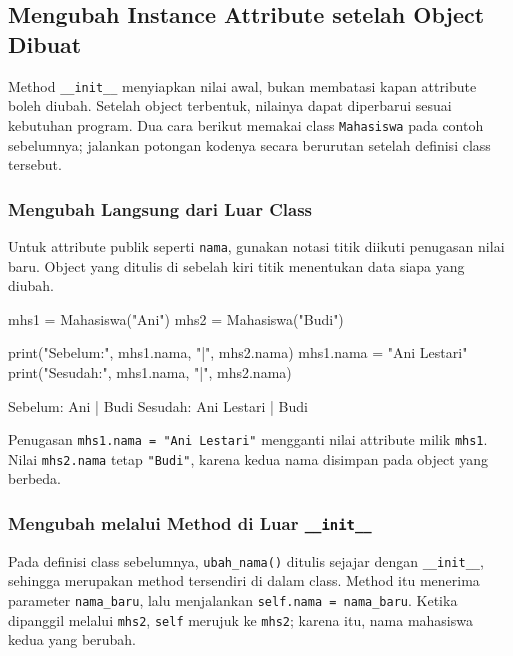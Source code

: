 \subsection{Mengubah Instance Attribute setelah Object Dibuat}

Method \texttt{\_\_init\_\_} menyiapkan nilai awal, bukan membatasi kapan attribute boleh diubah. Setelah object terbentuk, nilainya dapat diperbarui sesuai kebutuhan program. Dua cara berikut memakai class \texttt{Mahasiswa} pada contoh sebelumnya; jalankan potongan kodenya secara berurutan setelah definisi class tersebut.

\subsubsection{Mengubah Langsung dari Luar Class}

Untuk attribute publik seperti \texttt{nama}, gunakan notasi titik diikuti penugasan nilai baru. Object yang ditulis di sebelah kiri titik menentukan data siapa yang diubah.

\begin{kode}
mhs1 = Mahasiswa("Ani")
mhs2 = Mahasiswa("Budi")

print("Sebelum:", mhs1.nama, "|", mhs2.nama)
mhs1.nama = "Ani Lestari"
print("Sesudah:", mhs1.nama, "|", mhs2.nama)
\end{kode}

\begin{keluaran}
Sebelum: Ani | Budi
Sesudah: Ani Lestari | Budi
\end{keluaran}

Penugasan \texttt{mhs1.nama = "Ani Lestari"} mengganti nilai attribute milik \texttt{mhs1}. Nilai \texttt{mhs2.nama} tetap \texttt{"Budi"}, karena kedua nama disimpan pada object yang berbeda.

\subsubsection{Mengubah melalui Method di Luar \texttt{\_\_init\_\_}}

Pada definisi class sebelumnya, \texttt{ubah\_nama()} ditulis sejajar dengan \texttt{\_\_init\_\_}, sehingga merupakan method tersendiri di dalam class. Method itu menerima parameter \texttt{nama\_baru}, lalu menjalankan \texttt{self.nama = nama\_baru}. Ketika dipanggil melalui \texttt{mhs2}, \texttt{self} merujuk ke \texttt{mhs2}; karena itu, nama mahasiswa kedua yang berubah.

